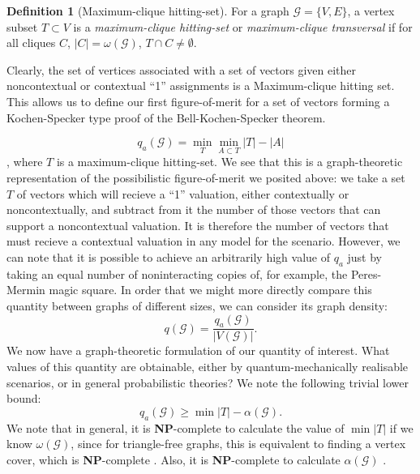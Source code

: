 \documentclass{amsart}
\theoremstyle{definition}
\newtheorem{defn}{Definition}
\begin{document}
\begin{defn}[Maximum-clique hitting-set]
For a graph $\mathcal{G}=\{V,E\}$, a vertex subset $T\subset V$ is a \emph{maximum-clique hitting-set} or \emph{maximum-clique transversal} if for all cliques $C$, $|C|=\omega(\mathcal{G})$, $T\cap C\neq\emptyset$.
\end{defn}

Clearly, the set of vertices associated with a set of vectors given either noncontextual or contextual ``1'' assignments is a Maximum-clique hitting set. This allows us to define our first figure-of-merit for a set of vectors forming a Kochen-Specker type proof of the Bell-Kochen-Specker theorem.

\begin{equation}q_a(\mathcal{G})=\min_T \min_{A\subset T} |T|-|A|\end{equation},
where $T$ is a maximum-clique hitting-set. We see that this is a graph-theoretic representation of the possibilistic figure-of-merit we posited above: we take a set $T$ of vectors which will recieve a ``1'' valuation, either contextually or noncontextually, and subtract from it the number of those vectors that can support a noncontextual valuation. It is therefore the number of vectors that must recieve a contextual valuation in any model for the scenario. However, we can note that it is possible to achieve an arbitrarily high value of $q_a$ just by taking an equal number of noninteracting copies of, for example, the Peres-Mermin magic square. In order that we might more directly compare this quantity between graphs of different sizes, we can consider its graph density:
\begin{equation}
q(\mathcal{G})=\frac{q_a(\mathcal{G})}{|V(\mathcal{G})|}.
\end{equation}
We now have a graph-theoretic formulation of our quantity of interest. What values of this quantity are obtainable, either by quantum-mechanically realisable scenarios, or in general probabilistic theories? We note the following trivial lower bound:
\begin{equation}
q_a(\mathcal{G})\geq \min |T|-\alpha(\mathcal{G}).
\end{equation}
We note that in general, it is \textbf{NP}-complete to calculate the value of $\min |T|$ if we know $\omega(\mathcal{G})$, since for triangle-free graphs, this is equivalent to finding a vertex cover, which is \textbf{NP}-complete \cite{Polj1974}. Also, it is \textbf{NP}-complete to calculate $\alpha(\mathcal{G})$ \cite{Gare1979}. 
\end{document}
